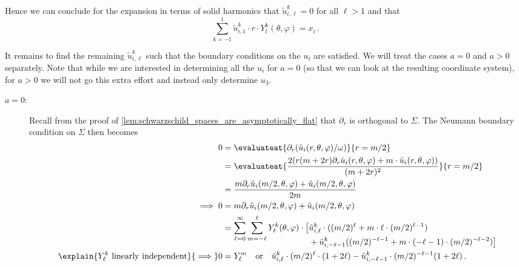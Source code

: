\documentclass[titlepage,numbers=noenddot,oneside,%
cleardoublepage=empty,paper=a4,fontsize=11pt,%
english,%
]{scrartcl}
\newcommand*{\mathfullstop}{\,.}
\begin{document}
Hence we can conclude for the expansion in terms of solid harmonics that \( \tilde{u}^k_{i,\ell}=0 \) for all \( \ell>1 \) and that
\begin{equation}
    \sum_{k=-1}^1 \tilde{u}^k_{i,1}\cdot r \cdot Y^k_l(\theta,\varphi)=x_i\mathfullstop\label{eq:schwarzschld_harmonic_linear_part}
\end{equation}

It remains to find the remaining \( \tilde{u}^k_{i,\ell} \) such that the boundary conditions on the \( u_i \) are satisfied. We will treat the cases \( a=0 \) and \( a>0 \) separately. Note that while we are interested in determining all the \( u_i \) for \( a=0 \) (so that we can look at the resulting coordinate system), for \( a>0 \) we will not go this extra effort and instead only determine \( u_3 \).
\begin{description}
    \item[\( a=0 \):] 
    Recall from the proof of \cref{lem:schwarzschild_spaces_are_asymptotically_flat} that \( \partial_r \) is orthogonal to \( \Sigma \). The Neumann boundary condition on \( \Sigma \) then becomes
    \begin{align*}\allowdisplaybreaks
        0&\begin{aligned}[t]
            &=\evaluateat{\partial_{r} (\tilde{u}_i(r,\theta,\varphi)/\omega)}{r=m/2}\\
            &=\evaluateat{\frac{2(r(m+2r)\partial_r \tilde{u}_i(r,\theta,\varphi)+m\cdot \tilde{u}_i(r,\theta,\varphi))}{(m+2r)^2}}{r=m/2}\\
            &=\frac{m\partial_r \tilde{u}_i(m/2,\theta,\varphi)+\tilde{u}_i(m/2,\theta,\varphi)}{2m}
        \end{aligned}\\
        \implies 0&\begin{aligned}[t]
            &=m \partial_r \tilde{u}_i(m/2,\theta,\varphi)+\tilde{u}_i(m/2,\theta,\varphi)\\
            &=\sum_{\ell=0}^\infty \sum_{m=-\ell}^\ell  Y_{\ell}^k(\theta,\varphi)\cdot  \begin{aligned}[t]
                \big[&\tilde{u}_{i,\ell}^k\cdot ((m/2)^\ell+m\cdot \ell\cdot (m/2)^{\ell-1})\\
                &+\tilde{u}^k_{i,-\ell-1}((m/2)^{-\ell-1}+m\cdot (-\ell-1)\cdot (m/2)^{-\ell-2})\big]
            \end{aligned}
        \end{aligned}\\
        \explain{\text{\( Y_{\ell}^k \) linearly independent}}{\implies} 0&=Y^m_{\ell}\quad \text{or}\quad \tilde{u}_{i,\ell}^k\cdot (m/2)^\ell\cdot (1+2\ell)-\tilde{u}^k_{i,-\ell-1}\cdot (m/2)^{-\ell-1}(1+2\ell)\mathfullstop

\end{align*}
\end{description}
\end{document}
